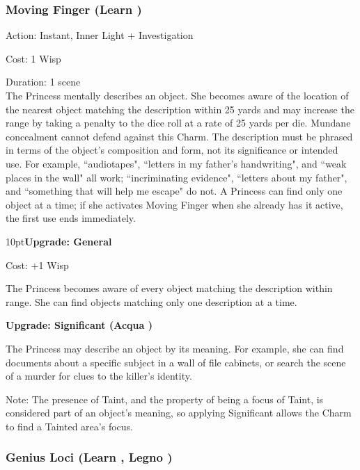 \subsubsection*{Moving Finger (Learn \textbullet\textbullet\textbullet)}

\noindent Action: Instant, Inner Light + Investigation

\noindent Cost: 1 Wisp

\noindent Duration: 1 scene \\

\noindent The Princess mentally describes an object. She becomes aware of the location of the nearest object matching the description within 25 yards and may increase the range by taking a penalty to the dice roll at a rate of 25 yards per die. Mundane concealment cannot defend against this Charm. The description must be phrased in terms of the object's composition and form, not its significance or intended use. For example, \textquotedblleft audiotapes", \textquotedblleft letters in my father's handwriting", and \textquotedblleft weak places in the wall" all work; \textquotedblleft incriminating evidence", \textquotedblleft letters about my father", and \textquotedblleft something that will help me escape" do not. A Princess can find only one object at a time; if she activates Moving Finger when she already has it active, the first use ends immediately.

\begin{myindentpar}{10pt}\textbf{Upgrade: General}

\noindent Cost: +1 Wisp

The Princess becomes aware of every object matching the description within range. She can find objects matching only one description at a time.

\textbf{Upgrade: Significant (Acqua \textbullet\textbullet)}

The Princess may describe an object by its meaning. For example, she can find documents about a specific subject in a wall of file cabinets, or search the scene of a murder for clues to the killer's identity.

Note: The presence of Taint, and the property of being a focus of Taint, is considered part of an object's meaning, so applying Significant allows the Charm to find a Tainted area's focus.\end{myindentpar}


\subsubsection*{Genius Loci (Learn \textbullet\textbullet\textbullet, Legno \textbullet\textbullet)} 

